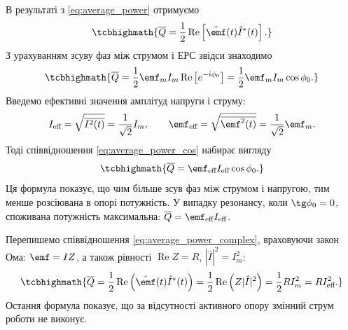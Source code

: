 В результаті з \eqref{eq:average_power} отримуємо
\begin{equation}\label{eq:average_power_complex}
	\tcbhighmath{
		\overline{Q} = \frac{1}{2}\operatorname{Re}\left[\hat{\emf}(t)\hat{I}^*(t)\right].
	}
\end{equation}
З урахуванням зсуву фаз між струмом і ЕРС звідси знаходимо
\begin{equation}\label{eq:average_power_cos}
	\tcbhighmath{
		\overline{Q} = \frac{1}{2}\emf_m I_m \operatorname{Re}\left[e^{-i\phi_0}\right]
		= \frac{1}{2}\emf_m I_m \cos\phi_0.
	}
\end{equation}
Введемо ефективні значення амплітуд напруги і струму:
\begin{equation}\label{eq:effective_values}
	I_{\text{eff}} = \sqrt{\overline{I^2(t)}} = \frac{1}{\sqrt{2}}I_m, \qquad
	\emf_{\text{eff}} = \sqrt{\overline{\emf^2(t)}} = \frac{1}{\sqrt{2}}\emf_m.
\end{equation}
Тоді співвідношення \eqref{eq:average_power_cos} набирає вигляду
\begin{equation}\label{eq:average_power_effective}
	\tcbhighmath{
		\overline{Q} = \emf_{\text{eff}} I_{\text{eff}} \cos\phi_0.
	}
\end{equation}
Ця формула показує, що чим більше зсув фаз між струмом і напругою, тим менше розсіювана в опорі потужність. У
випадку резонансу, коли $\tg\phi_0 = 0$, споживана потужність максимальна: $\overline{Q} = \emf_{\text{eff}} I_{\text{eff}}$.

Перепишемо співвідношення \eqref{eq:average_power_complex}, враховуючи закон Ома: $\emf = IZ$, а
також рівності $\operatorname{Re} Z = R$, $|\hat{I}|^2 = I_m^2$:
\begin{equation}\label{eq:average_power_resistance}
	\tcbhighmath{
		\overline{Q} = \frac{1}{2}\operatorname{Re}\left(\hat{\emf}(t)\hat{I}^*(t)\right)
		= \frac{1}{2}\operatorname{Re}\left(Z|\hat{I}|^2\right)
		= \frac{1}{2}RI_m^2 = RI_{\text{eff}}^2.
	}
\end{equation}
Остання формула показує, що за відсутності активного опору змінний струм роботи не виконує.


